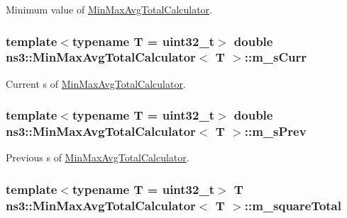 Minimum value of \hyperlink{classns3_1_1MinMaxAvgTotalCalculator}{Min\+Max\+Avg\+Total\+Calculator}. 

\subsubsection[{\texorpdfstring{m\+\_\+s\+Curr}{m_sCurr}}]{\setlength{\rightskip}{0pt plus 5cm}template$<$typename T = uint32\+\_\+t$>$ double {\bf ns3\+::\+Min\+Max\+Avg\+Total\+Calculator}$<$ T $>$\+::m\+\_\+s\+Curr\hspace{0.3cm}{\ttfamily [protected]}}\hypertarget{classns3_1_1MinMaxAvgTotalCalculator_a8e6d192daf13e180b5445b41b2dd9434}{}\label{classns3_1_1MinMaxAvgTotalCalculator_a8e6d192daf13e180b5445b41b2dd9434}


Current s of \hyperlink{classns3_1_1MinMaxAvgTotalCalculator}{Min\+Max\+Avg\+Total\+Calculator}. 

\subsubsection[{\texorpdfstring{m\+\_\+s\+Prev}{m_sPrev}}]{\setlength{\rightskip}{0pt plus 5cm}template$<$typename T = uint32\+\_\+t$>$ double {\bf ns3\+::\+Min\+Max\+Avg\+Total\+Calculator}$<$ T $>$\+::m\+\_\+s\+Prev\hspace{0.3cm}{\ttfamily [protected]}}\hypertarget{classns3_1_1MinMaxAvgTotalCalculator_afaae4416144cd1c12770677913e3cb01}{}\label{classns3_1_1MinMaxAvgTotalCalculator_afaae4416144cd1c12770677913e3cb01}


Previous s of \hyperlink{classns3_1_1MinMaxAvgTotalCalculator}{Min\+Max\+Avg\+Total\+Calculator}. 

\subsubsection[{\texorpdfstring{m\+\_\+square\+Total}{m_squareTotal}}]{\setlength{\rightskip}{0pt plus 5cm}template$<$typename T = uint32\+\_\+t$>$ T {\bf ns3\+::\+Min\+Max\+Avg\+Total\+Calculator}$<$ T $>$\+::m\+\_\+square\+Total\hspace{0.3cm}{\ttfamily [protected]}}\hypertarget{classns3_1_1MinMaxAvgTotalCalculator_a07c13a50a6e7c3eaa5b9d75f804416aa}{}\label{classns3_1_1MinMaxAvgTotalCalculator_a07c13a50a6e7c3eaa5b9d75f804416aa}


